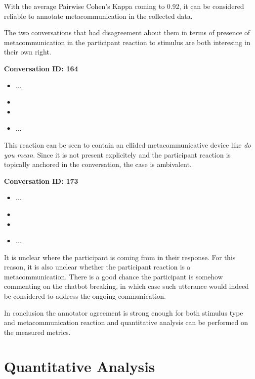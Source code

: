 With the average Pairwise Cohen's Kappa coming to 0.92,
it can be considered reliable to annotate metacommunication
in the collected data.

The two conversations that had disagreement about them in terms of
presence of metacommunication in the participant reaction to stimulus
are both interesing in their own right.

\textbf{Conversation ID: 164}

\begin{itemize}[label={}, leftmargin=0pt, itemsep=0.5em]
\item ...
\item {}
\item {}
\item ...
\end{itemize}

This reaction can be seen to contain an ellided metacommunicative device like \textit{do you mean}.
Since it is not present explicitely and the participant reaction is topically anchored in the conversation,
the case is ambivalent.

\textbf{Conversation ID: 173}

\begin{itemize}[label={}, leftmargin=0pt, itemsep=0.5em]
\item ...
\item {}
\item {}
\item ...
\end{itemize}

It is unclear where the participant is coming from in their response.
For this reason, it is also unclear whether the participant reaction is a metacommunication.
There is a good chance the participant is somehow commenting on the chatbot breaking,
in which case such utterance would indeed be considered to address the ongoing communication.

\par
In conclusion the annotator agreement is
strong enough for both stimulus type and metacommunication reaction and
quantitative analysis can be performed on the measured metrics.

\section{Quantitative Analysis}

